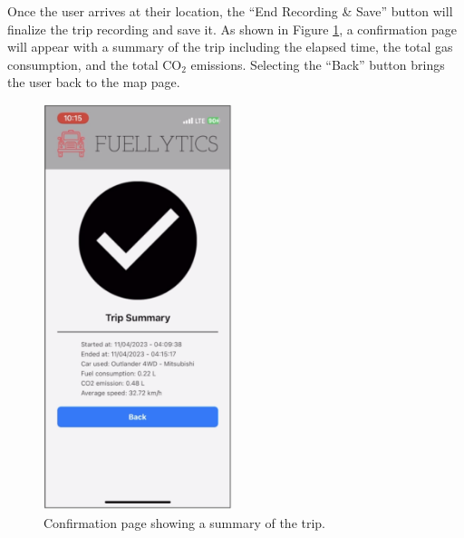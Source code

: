 \documentclass[11pt, oneside]{article}
\begin{document}
Once the user arrives at their location, the ``End Recording \& Save'' button will finalize the trip recording and save it.  As shown in Figure \ref*{fig:confirmation}, a confirmation page will appear with a summary of the trip including the elapsed time, the total gas consumption, and the total CO$_2$ emissions. Selecting the ``Back'' button brings the user back to the map page.
\begin{figure}[H]
\centerline{\includegraphics[width=5.5cm]{img/confirmation.png}}
\caption{\label{fig:confirmation} Confirmation page showing a summary of the trip.}
\end{figure}
\end{document}
